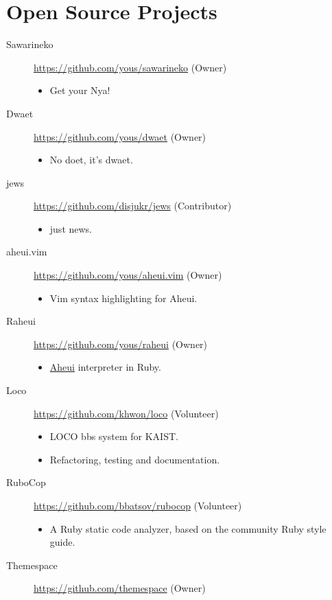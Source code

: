 \documentclass[a4paper,10pt]{article}
\begin{document}
\section{Open Source Projects}
\begin{description}
  \item[Sawarineko] \url{https://github.com/yous/sawarineko} (Owner)
    \begin{itemize}
      \item Get your Nya!
    \end{itemize}
  \item[Dwaet] \url{https://github.com/yous/dwaet} (Owner)
    \begin{itemize}
      \item No doet, it's dwaet.
    \end{itemize}
  \item[jews] \url{https://github.com/disjukr/jews} (Contributor)
    \begin{itemize}
      \item just news.
    \end{itemize}
  \item[aheui.vim] \url{https://github.com/yous/aheui.vim} (Owner)
    \begin{itemize}
      \item Vim syntax highlighting for Aheui.
    \end{itemize}
  \item[Raheui] \url{https://github.com/yous/raheui} (Owner)
    \begin{itemize}
      \item \href{http://aheui.github.io}{Aheui} interpreter in Ruby.
    \end{itemize}
  \item[Loco] \url{https://github.com/khwon/loco} (Volunteer)
    \begin{itemize}
      \item LOCO bbs system for KAIST.
      \item Refactoring, testing and documentation.
    \end{itemize}
  \item[RuboCop] \url{https://github.com/bbatsov/rubocop} (Volunteer)
    \begin{itemize}
      \item A Ruby static code analyzer, based on the community Ruby style guide.
    \end{itemize}
  \item[Themespace] \url{https://github.com/themespace} (Owner)

\end{description}
\end{document}
